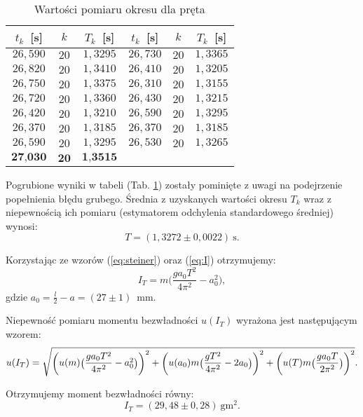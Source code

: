 \documentclass[12pt,a4paper]{article}
\numberwithin{equation}{section}
\begin{document}
\begin{table}[!ht]
	\caption{Wartości pomiaru okresu dla pręta}
	\centering 
	\begin{tabular}{c|c|c||c|c|c} \hline
		$t_k$~[s] & $k$ & $T_k$~[s] & $t_k$~[s] & $k$ & $T_k$~[s] \\ \hline \hline
		$26,590$ & $20$ & $1,3295$ & $26,730$ & $20$ & $1,3365$ \\
		$26,820$ & $20$ & $1,3410$ & $26,410$ & $20$ & $1,3205$ \\
		$26,750$ & $20$ & $1,3375$ & $26,310$ & $20$ & $1,3155$ \\
		$26,720$ & $20$ & $1,3360$ & $26,430$ & $20$ & $1,3215$ \\
		$26,420$ & $20$ & $1,3210$ & $26,590$ & $20$ & $1,3295$ \\
		$26,370$ & $20$ & $1,3185$ & $26,370$ & $20$ & $1,3185$ \\
		$26,590$ & $20$ & $1,3295$ & $26,530$ & $20$ & $1,3265$ \\
		$\textbf{27,030}$ & $\textbf{20}$ & $\textbf{1,3515}$ & & &\\ \hline
	\end{tabular}
	\label{tab:tab1}
\end{table}
		
Pogrubione wyniki w tabeli (Tab. \ref{tab:tab1}) zostały pominięte z uwagi na podejrzenie popełnienia błędu grubego. Średnia z uzyskanych wartości okresu $T_k$ wraz z niepewnością ich pomiaru (estymatorem odchylenia standardowego średniej) wynosi:
\begin{equation}
	T = (1,3272 \pm 0,0022)~\textrm{s}.
\end{equation}

Korzystając ze wzorów (\ref{eq:steiner}) oraz (\ref{eq:I}) otrzymujemy:
\begin{equation}
	I_T = m \Bigg(\frac{g a_0 T^2}{4 \pi^2} - a_0^2\Bigg),
	\label{eq:IT}
\end{equation}
gdzie $a_0 = \frac{l}{2} - a = (27 \pm 1)$~mm.

Niepewność pomiaru momentu bezwładności $u(I_T)$ wyrażona jest następującym wzorem:
\begin{equation}
	\scriptsize
	u(I_T) = \sqrt{\Bigg(u(m) \Big(\frac{g a_0 T^2}{4 \pi^2} - a_0^2\Big)\Bigg)^2 + \Bigg(u(a_0) m \Big(\frac{g T^2}{4 \pi^2} - 2a_0\Big)\Bigg)^2 + \Bigg(u(T) m \Big(\frac{g a_0 T}{2 \pi^2}\Big)\Bigg)^2}.
	\label{eq:uIT}
\end{equation}

Otrzymujemy moment bezwładności równy:
\begin{equation}
I_T = (29,48 \pm 0,28)~\textrm{gm}^2.
\end{equation}
\end{document}
